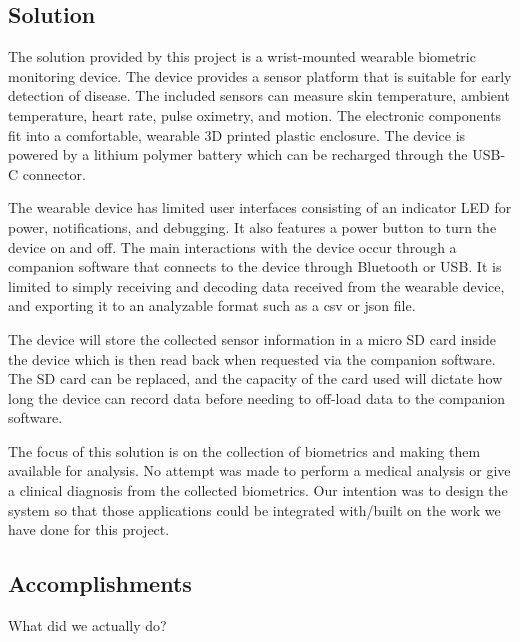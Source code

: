 \subsection{Solution}

The solution provided by this project is a wrist-mounted wearable biometric 
monitoring device. The device provides a sensor platform that is suitable for 
early detection of disease. The included sensors can measure skin temperature, 
ambient temperature, heart rate, pulse oximetry, and motion.  The electronic
components fit into a comfortable, wearable 3D printed plastic enclosure.
The device is powered by a lithium polymer battery which can be recharged
through the USB-C connector.

The wearable device has limited user interfaces consisting of an indicator
LED for power, notifications, and debugging. It also features a power button
to turn the device on and off. The main interactions with the device occur 
through a companion software that connects to the device through Bluetooth or 
USB. It is limited to simply receiving and decoding data received from the 
wearable device, and exporting it to an analyzable format such as a csv or json 
file.

The device will store the collected sensor information in a micro SD card
inside the device which is then read back when requested via the companion software.
The SD card can be replaced, and the capacity of the card used will dictate
how long the device can record data before needing to off-load data to the companion
software.

The focus of this solution is on the collection of biometrics and making them
available for analysis. No attempt was made to perform a medical analysis
or give a clinical diagnosis from the collected biometrics. Our intention was to
design the system so that those applications could be integrated with/built
on the work we have done for this project.

\subsection{Accomplishments}
{\color{red}
What did we actually do?
}


